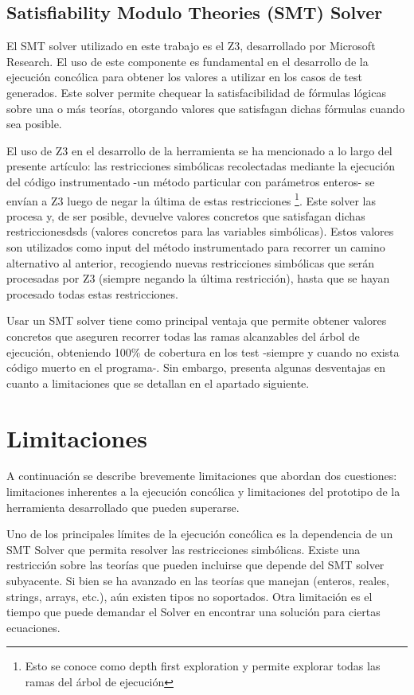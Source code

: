 \documentclass{llncs}
\begin{document}
\subsection{Satisfiability Modulo Theories (SMT) Solver}
El SMT solver utilizado en este trabajo es el Z3, desarrollado por Microsoft Research. El uso de este componente es fundamental en el desarrollo
de la ejecución concólica para obtener los valores a utilizar en los casos de test generados. Este solver permite chequear la satisfacibilidad
de fórmulas lógicas sobre una o más teorías, otorgando valores que satisfagan dichas fórmulas cuando sea posible.

El uso de Z3 en el desarrollo de la herramienta se ha mencionado a lo largo del presente artículo: las restricciones simbólicas recolectadas mediante
la ejecución del código instrumentado -un método particular con parámetros enteros- se envían a Z3 luego de negar la última de estas
restricciones \footnote{Esto se conoce como depth first exploration y permite explorar todas las ramas del árbol de ejecución}. Este solver las procesa y,
de ser posible, devuelve valores concretos que satisfagan dichas restriccionesdsds (valores concretos para las variables simbólicas). Estos valores son
utilizados como input del método instrumentado para recorrer un camino alternativo al anterior, recogiendo nuevas restricciones simbólicas que serán
procesadas por Z3 (siempre negando la última restricción), hasta que se hayan procesado todas estas restricciones.

Usar un SMT solver tiene como principal ventaja que permite obtener valores concretos que aseguren recorrer todas las ramas alcanzables del árbol de ejecución,
obteniendo 100\% de cobertura en los test -siempre y cuando no exista código muerto en el programa-. Sin embargo, presenta algunas desventajas en cuanto a
limitaciones que se detallan en el apartado siguiente.

\section{Limitaciones}
A continuación se describe brevemente limitaciones que abordan dos cuestiones: limitaciones inherentes a la ejecución concólica y limitaciones
del prototipo de la herramienta desarrollado que pueden superarse.

Uno de los principales límites de la ejecución concólica es la dependencia de un SMT Solver que permita resolver las restricciones simbólicas.
Existe una restricción sobre las teorías que pueden incluirse que depende del SMT solver subyacente. Si bien se ha avanzado en las teorías
que manejan (enteros, reales, strings, arrays, etc.), aún existen tipos no soportados. Otra limitación es el tiempo que puede demandar el
Solver en encontrar una solución para ciertas ecuaciones.
\end{document}
